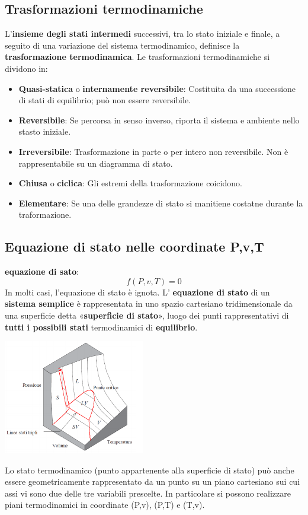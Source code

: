 \subsection{Trasformazioni termodinamiche}
L’\textbf{insieme degli stati intermedi} successivi, tra lo stato iniziale e finale, a seguito di una variazione del sistema termodinamico, definisce la \textbf{trasformazione termodinamica}.\newline
\newline
Le trasformazioni termodinamiche si dividono in:
\begin{itemize}
    \item \textbf{Quasi-statica} o \textbf{internamente reversibile}: Costituita da una successione di stati di equilibrio; può non essere reversibile.
    \item \textbf{Reversibile}: Se percorsa in senso inverso, riporta il sistema e ambiente nello stasto iniziale.
    \item \textbf{Irreversibile}: Trasformazione in parte o per intero non reversibile. Non è rappresentabile su un diagramma di stato.
    \item \textbf{Chiusa} o \textbf{ciclica}: Gli estremi della trasformazione coicidono.
    \item \textbf{Elementare}: Se una delle grandezze di stato si manitiene costatne durante la traformazione.
\end{itemize}
\subsection{Equazione di stato nelle coordinate P,v,T}
\textbf{equazione di sato}:
\[
    f(P,v,T) = 0
\]
In molti casi, l'equazione di stato è ignota.\newline
\newline
L’ \textbf{equazione di stato} di un \textbf{sistema semplice} è rappresentata in uno spazio cartesiano tridimensionale da una superficie detta «\textbf{superficie di stato}», luogo dei punti rappresentativi di \textbf{tutti i possibili stati} termodinamici di \textbf{equilibrio}.
\begin{center}
    \includegraphics[height=5cm]{../L01/img4.PNG}
\end{center}
Lo stato termodinamico (punto appartenente alla superficie di stato) può anche essere geometricamente
rappresentato da un punto su un piano cartesiano sui cui assi vi sono due delle tre variabili prescelte.\newline
In particolare si possono realizzare piani termodinamici in coordinate (P,v), (P,T) e (T,v).
